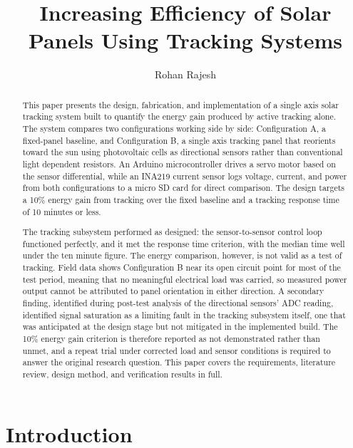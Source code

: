 \documentclass[journal]{IEEEtran}
\begin{document}
\title{Increasing Efficiency of Solar Panels Using Tracking Systems}
\author{Rohan Rajesh}
\markboth{}{}
\maketitle

\begin{abstract}
This paper presents the design, fabrication, and implementation of a single axis solar
tracking system built to quantify the energy gain produced by active tracking alone.
The system compares two configurations working side by side: Configuration A, a
fixed-panel baseline, and Configuration B, a single axis tracking panel that reorients
toward the sun using photovoltaic cells as directional sensors rather than conventional
light dependent resistors. An Arduino microcontroller drives a servo motor based on the
sensor differential, while an INA219 current sensor logs voltage, current, and power from
both configurations to a micro SD card for direct comparison. The design targets a 10\%
energy gain from tracking over the fixed baseline and a tracking response time of 10
minutes or less.

The tracking subsystem performed as designed: the sensor-to-sensor control loop
functioned perfectly, and it met the response time criterion, with the median time well
under the ten minute figure. The energy comparison, however, is not valid as a test of
tracking. Field data shows Configuration B near its open circuit point for most of the
test period, meaning that no meaningful electrical load was carried, so measured power
output cannot be attributed to panel orientation in either direction. A secondary
finding, identified during post-test analysis of the directional sensors' ADC reading,
identified signal saturation as a limiting fault in the tracking subsystem itself, one
that was anticipated at the design stage but not mitigated in the implemented build. The
10\% energy gain criterion is therefore reported as not demonstrated rather than unmet,
and a repeat trial under corrected load and sensor conditions is required to answer the
original research question. This paper covers the requirements, literature review,
design method, and verification results in full.
\end{abstract}

\section{Introduction}
\end{document}
